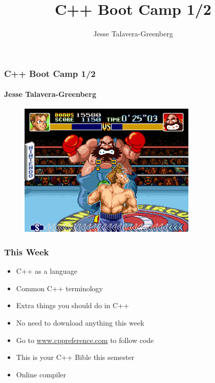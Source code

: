 \documentclass[glossy]{beamer}
\title{C++ Boot Camp 1/2}
\author{Jesse Talavera-Greenberg}
\date{}
\begin{document}
\newcommand{\cppref}[2]{\href{http://en.cppreference.com/w/cpp/#1}{\underline{#2}}}

\begin{frame}[fragile=singleslide]
  \frametitle{C++ Boot Camp 1/2}
  \framesubtitle{Jesse Talavera-Greenberg}
  \begin{figure}
    \includegraphics[width=.75\columnwidth]{super-punch-out}
    \centering
  \end{figure}
\end{frame}

\begin{frame}[fragile=singleslide]
\frametitle{This Week}
  \begin{itemize}
    \item C++ as a language
    \item Common C++ terminology
    \item Extra things you should do in C++
    \item No need to download anything this week
    \item Go to \href{www.cppreference.com}{www.cppreference.com} to follow code
    \item This is your C++ Bible this semester
    \item Online compiler
  \end{itemize}
\end{frame}
\end{document}
